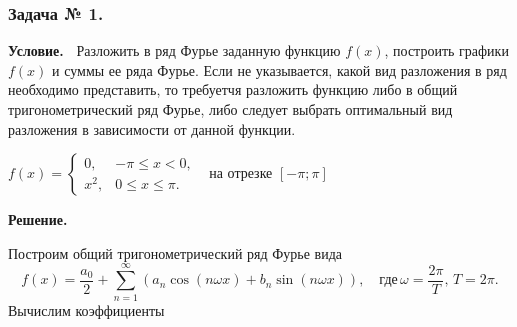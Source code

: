 \subsubsection*{\center Задача № 1.}
{\bf Условие.~}
Разложить в ряд Фурье заданную функцию $f(x)$, построить графики $f(x)$ и суммы ее ряда Фурье. Если не указывается, какой вид разложения в ряд необходимо представить, то требуетчя разложить функцию либо в общий тригонометрический ряд Фурье, либо следует выбрать оптимальный вид разложения в зависимости от данной функции.
\begin{center}

	$f(x)=
	\left\{
	\begin{array}{cc}
	0, 		&	-\pi \leq x<0, \\ 
	x^{2}, 	& 	0 \leq x \leq \pi. 
	\end{array}\right. \ \ $ на отрезке $[-\pi ; \pi]  $ 
\end{center}
{\bf Решение.~}	
\begin{center}
	\begin{minipage}[t][6.75cm][c]{6.75cm}
	\end{minipage}		
\end{center}
\noindent
Построим общий тригонометрический ряд Фурье вида
$$
f(x)=\frac{a_0}{2}+\sum_{n=1}^\infty 
	\left(a_n\cos{(n\omega x)}+b_n\sin{(n\omega x)}\right),\quad\text{где}\,\omega=\frac{2\pi}{T},\,T=2\pi.
$$
\noindent
Вычислим коэффициенты
